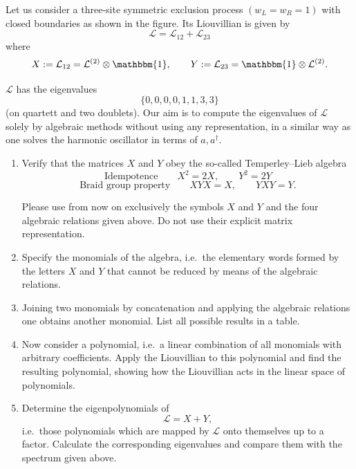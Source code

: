 \begin{Problem}
Let us consider a three-site symmetric exclusion process $(w_L = w_R = 1)$
with closed boundaries as shown in the figure. Its Liouvillian is given by
\[
\mathcal{L} = \mathcal{L}_{12} + \mathcal{L}_{23}
\]
where
\[
X := \mathcal{L}_{12} = \mathcal{L}^{(2)} \otimes \mathbbm{1},
\qquad
Y := \mathcal{L}_{23} = \mathbbm{1} \otimes \mathcal{L}^{(2)}.
\]

$\mathcal{L}$ has the eigenvalues
\[
\{0,0,0,0,1,1,3,3\}
\]
(on quartett and two doublets). Our aim is to compute the eigenvalues of
$\mathcal{L}$ solely by algebraic methods without using any representation,
in a similar way as one solves the harmonic oscillator in terms of $a,a^\dagger$.

\begin{enumerate}
    \item[(a)] Verify that the matrices $X$ and $Y$ obey the so-called
    Temperley--Lieb algebra
    \[
    \text{Idempotence}
    \qquad
    X^2 = 2X,
    \qquad
    Y^2 = 2Y
    \]
    \[
    \text{Braid group property}
    \qquad
    XYX = X,
    \qquad
    YXY = Y.
    \]

    Please use from now on exclusively the symbols $X$ and $Y$ and the four
    algebraic relations given above. Do not use their explicit matrix
    representation.

    \item[(b)] Specify the monomials of the algebra, i.e.\ the elementary words
    formed by the letters $X$ and $Y$ that cannot be reduced by means of the
    algebraic relations.

    \item[(c)] Joining two monomials by concatenation and applying the algebraic
    relations one obtains another monomial. List all possible results in a
    table.

    \item[(d)] Now consider a polynomial, i.e.\ a linear combination of all
    monomials with arbitrary coefficients. Apply the Liouvillian to this
    polynomial and find the resulting polynomial, showing how the Liouvillian
    acts in the linear space of polynomials.

    \item[(e)] Determine the eigenpolynomials of
    \[
    \mathcal{L} = X + Y,
    \]
    i.e.\ those polynomials which are mapped by $\mathcal{L}$ onto themselves
    up to a factor. Calculate the corresponding eigenvalues and compare them
    with the spectrum given above.
\end{enumerate}
\end{Problem}
